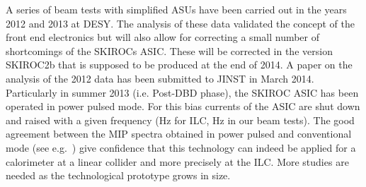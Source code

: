 A series of beam tests with simplified ASUs have been carried out in the years 2012 and 2013 at DESY. The analysis of these data validated the concept of the front end electronics but will also allow for correcting a small number of shortcomings of the SKIROCs ASIC. These will be corrected in the version SKIROC2b that is supposed to be produced at the end of 2014. A paper on the analysis of the 2012 data has been submitted to JINST in  March 2014.
Particularly in summer 2013 (i.e. Post-DBD phase), the SKIROC ASIC has been operated in power pulsed mode. For this bias currents of the ASIC are shut down and raised with a given frequency (\unit[5]{Hz} for ILC, \unit[10]{Hz} in our beam tests). The good agreement between the MIP spectra obtained in power pulsed and conventional mode (see e.g.~\cite{Poschl:Giessen:ECAL:2014}) give confidence that this technology can indeed be applied for a calorimeter at a linear collider and more precisely at the ILC. More studies are needed as the technological prototype grows in size.

